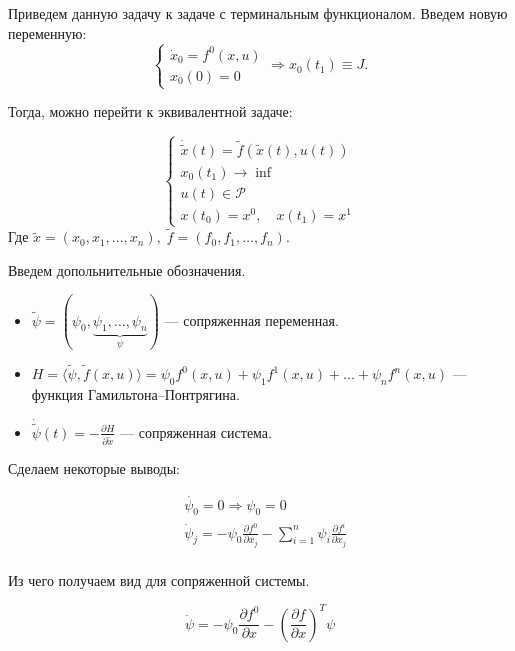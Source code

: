 \documentclass[oneside, final, 14pt, draft]{article}
\theoremstyle{definition}
\theoremstyle{definition}
\theoremstyle{remark}
\theoremstyle{theorem}
\begin{document}
{\flushleft Приведем данную задачу к задаче с терминальным функционалом. Введем новую переменную:}
\begin{equation*}
    \begin{cases}
        \dot x_0 = f^0(x,u)\\
        x_0(0) = 0
    \end{cases} \Rightarrow x_0(t_1) \equiv J.
\end{equation*}

{\flushleft Тогда, можно перейти к эквивалентной задаче:}

\begin{equation}\label{fsystem}
    \begin{cases}
        \dot{\widetilde{x}}(t) = \widetilde{f}(\widetilde{x}(t),u(t))\\
        x_0(t_1) \longrightarrow \inf\\
        u(t) \in \mathcal{P}\\
        x(t_0) = x^0,\quad x(t_1) = x^1
    \end{cases}
\end{equation}
Где $\widetilde{x} = (x_0,x_1,\ldots,x_n),\; \widetilde{f} = (f_0,f_1,\ldots,f_n)$.

{\flushleft Введем допольнительные обозначения.}

\begin{itemize}
\item $\widetilde{\psi} = (\psi_0,\underbrace{\psi_1,\ldots,\psi_n}_\psi) \text{ --- сопряженная переменная}.$
\item $H = \langle \widetilde{\psi}, \widetilde{f}(x,u)\rangle = \psi_0 f^0(x,u) + \psi_1 f^1(x,u) + ... + \psi_n f^n(x,u)$ --- функция Гамильтона--Понтрягина.
\item $\dot{\widetilde{\psi}}(t) = -\displaystyle \frac{\partial H}{\partial \widetilde{x}}$ --- сопряженная система.
\end{itemize}

Сделаем некоторые выводы:

\begin{align*}
&\dot{\psi_0} = 0 \Rightarrow \psi_0 = 0\\
&\dot{\psi}_j = - \psi_0 \frac{\partial f^0}{\partial x_j} - \sum\limits_{i = 1}^{n} \psi_i \frac{\partial f^i}{\partial x_j}\\
\end{align*}

Из чего получаем вид для сопряженной системы.

$$\dot{\psi} = - \psi_0 \frac{\partial f^0}{\partial x} - \left( \frac{\partial f}{\partial x}\right)^T \psi$$
\end{document}
